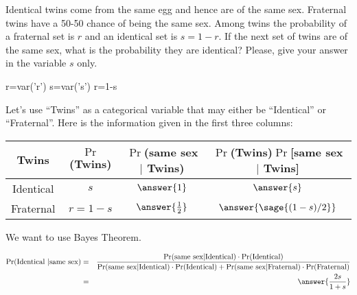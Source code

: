 \documentclass{ximera}
\begin{document}
\begin{problem}

Identical twins come from the same egg and hence are of the same sex. Fraternal twins have a 50-50 chance of being the same sex. Among twins the probability of a fraternal set is $r$ and an identical set is $s = 1 - r$. If the next set of twins are of the same sex, what is the probability they are identical? Please, give your answer in the variable $s$ only.
\begin{sagesilent}
r=var('r')
s=var('s')
r=1-s
\end{sagesilent}
\begin{hint}
Let's use ``Twins'' as a categorical variable that may either be ``Identical'' or ``Fraternal''. Here is the information given in the first three columns:

\begin{tabular}{c|c|c|c}
Twins &	$\Pr$(Twins) &	$\Pr$(same sex $|$ Twins)&	$\Pr$(Twins)$\Pr$[same sex $|$ Twins] \\
\hline
Identical &	$s$ &	$\answer{1}$ &	$\answer{s}$ \\
\hline
Fraternal &	$r=1-s$	& $\answer{\frac{1}{2}}$ &	$\answer{\sage{(1-s)/2}}$ 
\end{tabular}

We want to use Bayes Theorem. 

\end{hint}

\begin{prompt}
\begin{eqnarray*} 
\Pr(\text{Identical } | \text{same sex}) &=& \frac{\Pr(\text{same sex}|\text{Identical} )\cdot \Pr(\text{Identical})} {\Pr(\text{same sex}|\text{Identical})\cdot \Pr(\text{Identical})+\Pr(\text{same sex}|\text{Fraternal})\cdot\Pr(\text{Fraternal})} \\ 
&=&%
\answer{\frac{2s}{1+s}}\\ 
\end{eqnarray*}
\end{prompt}
\end{problem}
\end{document}
